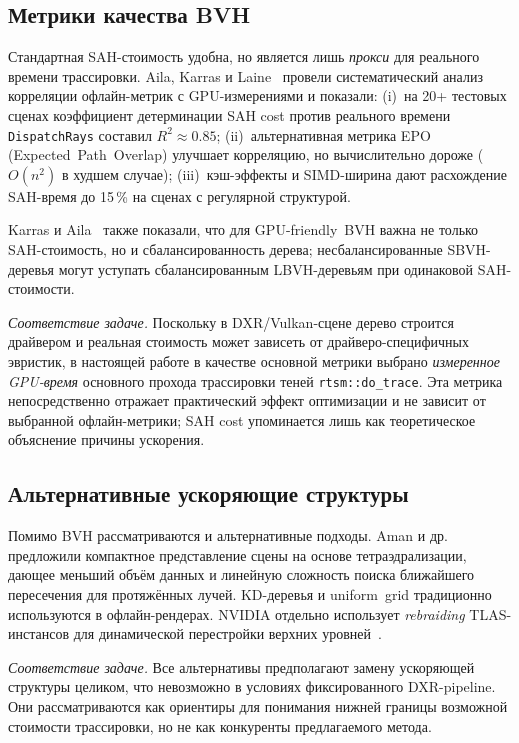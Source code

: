 \subsection{Метрики качества BVH}

Стандартная SAH-стоимость удобна, но является лишь \emph{прокси}
для реального времени трассировки. Aila, Karras и
Laine~\cite{ailaKarrasLaine2013} провели систематический анализ
корреляции офлайн-метрик с GPU-измерениями и показали:
(i)~на 20+ тестовых сценах коэффициент детерминации SAH cost
против реального времени \texttt{DispatchRays} составил
$R^2\!\approx\!0.85$;
(ii)~альтернативная метрика EPO (Expected~Path~Overlap) улучшает
корреляцию, но вычислительно дороже ($O(n^2)$ в худшем случае);
(iii)~кэш-эффекты и SIMD-ширина дают расхождение SAH-время до
15\,\% на сценах с регулярной структурой.

Karras и Aila~\cite{karras2013} также показали, что для
GPU-friendly~BVH важна не только SAH-стоимость, но и
сбалансированность дерева; несбалансированные SBVH-деревья могут
уступать сбалансированным LBVH-деревьям при одинаковой
SAH-стоимости.

\textit{Соответствие задаче.} Поскольку в DXR/Vulkan-сцене дерево
строится драйвером и реальная стоимость может зависеть от
драйверо-специфичных эвристик, в настоящей работе в качестве
основной метрики выбрано \emph{измеренное GPU-время} основного
прохода трассировки теней \texttt{rtsm::do\_trace}. Эта метрика
непосредственно отражает практический эффект оптимизации и не
зависит от выбранной офлайн-метрики; SAH cost упоминается лишь
как теоретическое объяснение причины ускорения.

\subsection{Альтернативные ускоряющие структуры}

Помимо BVH рассматриваются и альтернативные подходы. Aman и
др.~\cite{tetra2021} предложили компактное представление сцены на
основе тетраэдрализации, дающее меньший объём данных и линейную
сложность поиска ближайшего пересечения для протяжённых лучей.
KD-деревья и uniform~grid традиционно используются в
офлайн-рендерах. NVIDIA отдельно использует \emph{rebraiding}
TLAS-инстансов для динамической перестройки верхних
уровней~\cite{nvOptMesh}.

\textit{Соответствие задаче.} Все альтернативы предполагают замену
ускоряющей структуры целиком, что невозможно в условиях
фиксированного DXR-pipeline. Они рассматриваются как ориентиры для
понимания нижней границы возможной стоимости трассировки, но не
как конкуренты предлагаемого метода.


